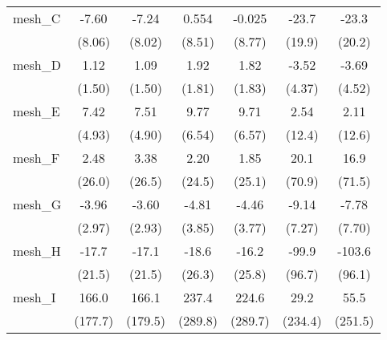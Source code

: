 \begin{tabular}{lcccccc}
   mesh\_C                                                     & -7.60         & -7.24         & 0.554          & -0.025         & -23.7       & -23.3\\   
                                                               & (8.06)        & (8.02)        & (8.51)         & (8.77)         & (19.9)      & (20.2)\\   
   mesh\_D                                                     & 1.12          & 1.09          & 1.92           & 1.82           & -3.52       & -3.69\\   
                                                               & (1.50)        & (1.50)        & (1.81)         & (1.83)         & (4.37)      & (4.52)\\   
   mesh\_E                                                     & 7.42          & 7.51          & 9.77           & 9.71           & 2.54        & 2.11\\   
                                                               & (4.93)        & (4.90)        & (6.54)         & (6.57)         & (12.4)      & (12.6)\\   
   mesh\_F                                                     & 2.48          & 3.38          & 2.20           & 1.85           & 20.1        & 16.9\\   
                                                               & (26.0)        & (26.5)        & (24.5)         & (25.1)         & (70.9)      & (71.5)\\   
   mesh\_G                                                     & -3.96         & -3.60         & -4.81          & -4.46          & -9.14       & -7.78\\   
                                                               & (2.97)        & (2.93)        & (3.85)         & (3.77)         & (7.27)      & (7.70)\\   
   mesh\_H                                                     & -17.7         & -17.1         & -18.6          & -16.2          & -99.9       & -103.6\\   
                                                               & (21.5)        & (21.5)        & (26.3)         & (25.8)         & (96.7)      & (96.1)\\   
   mesh\_I                                                     & 166.0         & 166.1         & 237.4          & 224.6          & 29.2        & 55.5\\   
                                                               & (177.7)       & (179.5)       & (289.8)        & (289.7)        & (234.4)     & (251.5)\\   

\end{tabular}
